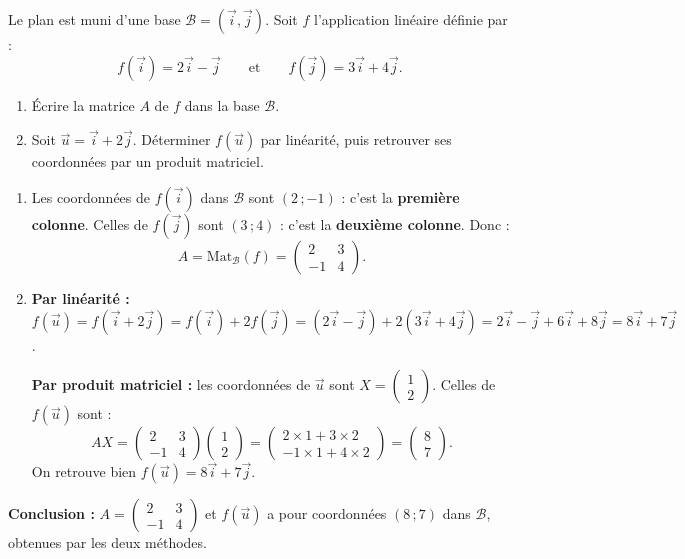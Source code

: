 \documentclass[11pt]{article}
\begin{document}
\begin{exoresolu}
Le plan est muni d'une base $\mathcal{B}=(\vec{i},\vec{j})$. Soit $f$ l'application linéaire définie par :
\[ f(\vec{i})=2\vec{i}-\vec{j} \qquad \text{et} \qquad f(\vec{j})=3\vec{i}+4\vec{j}. \]
\begin{enumerate}
\item Écrire la matrice $A$ de $f$ dans la base $\mathcal{B}$.
\item Soit $\vec{u}=\vec{i}+2\vec{j}$. Déterminer $f(\vec{u})$ par linéarité, puis retrouver ses coordonnées par un produit matriciel.
\end{enumerate}
\tcblower
\begin{enumerate}
\item Les coordonnées de $f(\vec{i})$ dans $\mathcal{B}$ sont $(2\,;-1)$ : c'est la \textbf{première colonne}. Celles de $f(\vec{j})$ sont $(3\,;4)$ : c'est la \textbf{deuxième colonne}. Donc :
\[ A=\mathrm{Mat}_{\mathcal{B}}(f)=\begin{pmatrix} 2 & 3 \\ -1 & 4 \end{pmatrix}. \]
\item \textbf{Par linéarité :} $f(\vec{u})=f(\vec{i}+2\vec{j})=f(\vec{i})+2f(\vec{j})=(2\vec{i}-\vec{j})+2(3\vec{i}+4\vec{j})=2\vec{i}-\vec{j}+6\vec{i}+8\vec{j}=8\vec{i}+7\vec{j}$.

\textbf{Par produit matriciel :} les coordonnées de $\vec{u}$ sont $X=\begin{pmatrix} 1 \\ 2 \end{pmatrix}$. Celles de $f(\vec{u})$ sont :
\[ AX=\begin{pmatrix} 2 & 3 \\ -1 & 4 \end{pmatrix}\begin{pmatrix} 1 \\ 2 \end{pmatrix}=\begin{pmatrix} 2\times 1+3\times 2 \\ -1\times 1+4\times 2 \end{pmatrix}=\begin{pmatrix} 8 \\ 7 \end{pmatrix}. \]
On retrouve bien $f(\vec{u})=8\vec{i}+7\vec{j}$.
\end{enumerate}
\textbf{Conclusion :} $A=\begin{pmatrix} 2 & 3 \\ -1 & 4 \end{pmatrix}$ et $f(\vec{u})$ a pour coordonnées $(8\,;7)$ dans $\mathcal{B}$, obtenues par les deux méthodes.
\end{exoresolu}
\end{document}
